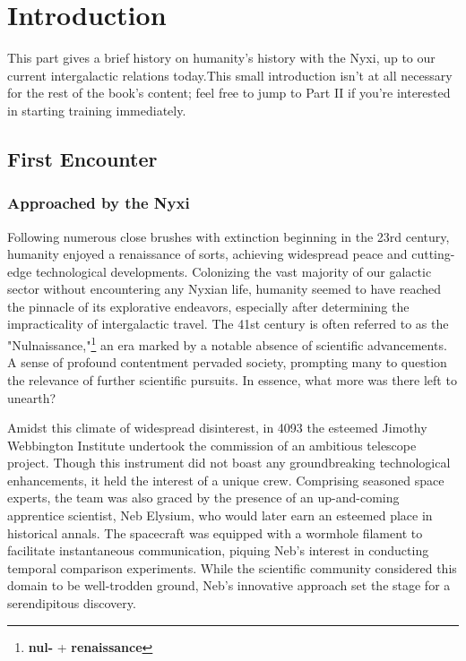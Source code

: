 
\part{Introduction}

\begin{remark}
	This part gives a brief history on humanity's history with the Nyxi, up to our
	current intergalactic relations today.This small introduction isn't at all
	necessary for the rest of the book's content; feel free to jump to Part II if
	you're interested in starting training immediately.%
\end{remark}



\chapter{First Encounter}

\section{Approached by the Nyxi}

Following numerous close brushes with extinction beginning in the 23rd century,
humanity enjoyed a renaissance of sorts, achieving widespread peace and
cutting-edge technological developments. Colonizing the vast majority of our
galactic sector without encountering any Nyxian life, humanity seemed to have
reached the pinnacle of its explorative endeavors, especially after determining
the impracticality of intergalactic travel. The 41st century is often referred
to as the "Nulnaissance,"\footnote{\textbf{nul-} + \textbf{renaissance}} an era
marked by a notable absence of scientific advancements. A sense of profound
contentment pervaded society, prompting many to question the relevance of
further scientific pursuits. In essence, what more was there left to unearth?

Amidst this climate of widespread disinterest, in 4093 the esteemed Jimothy
Webbington Institute undertook the commission of an ambitious telescope
project. Though this instrument did not boast any groundbreaking technological
enhancements, it held the interest of a unique crew. Comprising seasoned space
experts, the team was also graced by the presence of an up-and-coming
apprentice scientist, Neb Elysium, who would later earn an esteemed place in
historical annals. The spacecraft was equipped with a wormhole filament to
facilitate instantaneous communication, piquing Neb's interest in conducting
temporal comparison experiments. While the scientific community considered this
domain to be well-trodden ground, Neb's innovative approach set the stage for a
serendipitous discovery.

